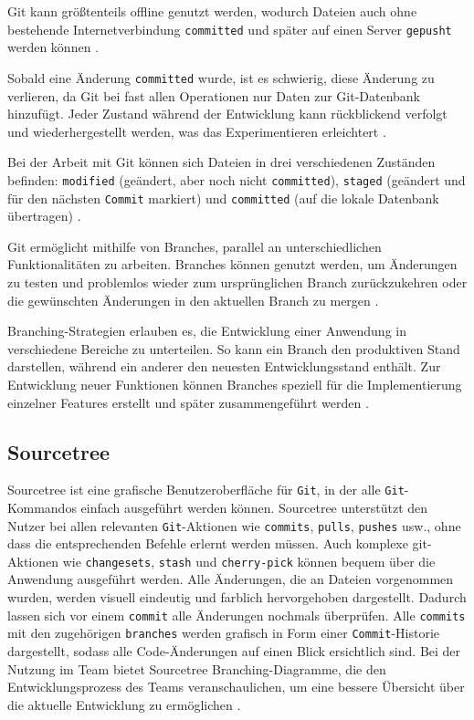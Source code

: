 \documentclass[oneside]{ausarbeitung}
\begin{document}
Git kann größtenteils offline genutzt werden, wodurch Dateien auch ohne bestehende Internetverbindung \texttt{committed} und später auf einen Server \texttt{gepusht} werden können \parencite{git_intro}.

Sobald eine Änderung \texttt{committed} wurde, ist es schwierig, diese Änderung zu verlieren, da Git bei fast allen Operationen nur Daten zur Git-Datenbank hinzufügt. Jeder Zustand während der Entwicklung kann rückblickend verfolgt und wiederhergestellt werden, was das Experimentieren erleichtert \parencite{git_intro}.

Bei der Arbeit mit Git können sich Dateien in drei verschiedenen Zuständen befinden: \texttt{modified} (geändert, aber noch nicht \texttt{committed}), \texttt{staged} (geändert und für den nächsten \texttt{Commit} markiert) und \texttt{committed} (auf die lokale Datenbank übertragen) \parencite{git_intro}.

Git ermöglicht mithilfe von Branches, parallel an unterschiedlichen Funktionalitäten zu arbeiten. Branches können genutzt werden, um Änderungen zu testen und problemlos wieder zum ursprünglichen Branch zurückzukehren oder die gewünschten Änderungen in den aktuellen Branch zu mergen \parencite{git-branching-merging}.

Branching-Strategien erlauben es, die Entwicklung einer Anwendung in verschiedene Bereiche zu unterteilen. So kann ein Branch den produktiven Stand darstellen, während ein anderer den neuesten Entwicklungsstand enthält. Zur Entwicklung neuer Funktionen können Branches speziell für die Implementierung einzelner Features erstellt und später zusammengeführt werden \parencite{git-branching-merging}.

\subsection{Sourcetree}
Sourcetree ist eine grafische Benutzeroberfläche für \texttt{Git}, in der alle \texttt{Git}-Kommandos einfach ausgeführt werden können. Sourcetree unterstützt den Nutzer bei allen relevanten \texttt{Git}-Aktionen wie \texttt{commits}, \texttt{pulls}, \texttt{pushes} usw., ohne dass die entsprechenden Befehle erlernt werden müssen. Auch komplexe git-Aktionen wie \texttt{changesets}, \texttt{stash} und \texttt{cherry-pick} können bequem über die Anwendung ausgeführt werden.
Alle Änderungen, die an Dateien vorgenommen wurden, werden visuell eindeutig und farblich hervorgehoben dargestellt. Dadurch lassen sich vor einem \texttt{commit} alle Änderungen nochmals überprüfen.
Alle \texttt{commits} mit den zugehörigen \texttt{branches} werden grafisch in Form einer \texttt{Commit}-Historie dargestellt, sodass alle Code-Änderungen auf einen Blick ersichtlich sind.
Bei der Nutzung im Team bietet Sourcetree Branching-Diagramme, die den Entwicklungsprozess des Teams veranschaulichen, um eine bessere Übersicht über die aktuelle Entwicklung zu ermöglichen \parencite{sourcetree}. 
\end{document}
